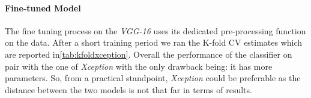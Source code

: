 \paragraph{Fine-tuned Model}
The fine tuning process on the \textit{VGG-16} uses its dedicated
pre-processing function on the data. After a short training period
we ran the K-fold CV estimates which are reported in\ref{tab:kfoldxception}.
Overall the performance of the classifier on pair with the one of \textit{Xception}
with the only drawback being: it has more parameters. So, from a practical standpoint,
\textit{Xception} could be preferable as the distance between the two models is not that far
in terms of results.